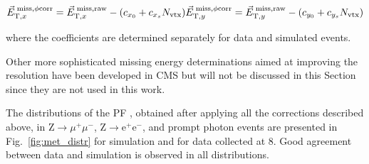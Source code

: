 \begin{equation}
{\vec E}_{\mathrm{T},x}^\mathrm{\; miss,\phi corr} = {\vec E}_{\mathrm{T},x}^\mathrm{\; miss,raw} - (c_{x_0} + c_{x_s}N_\mathrm{vtx})\\
{\vec E}_{\mathrm{T},y}^\mathrm{\; miss,\phi corr} = {\vec E}_{\mathrm{T},y}^\mathrm{\; miss,raw} - (c_{y_0} + c_{y_s}N_\mathrm{vtx})
\end{equation}

where the coefficients are determined separately for data and simulated events.

Other more sophisticated missing energy determinations aimed at improving the resolution have been developed in CMS\cite{Khachatryan:2014gga,CMS-PAS-JME-16-004} but will not be discussed in this Section since they are not used in this work.

The distributions of the PF \ETmiss, obtained after applying all the corrections described above, in Z$\rightarrow\mu^+\mu^-$, Z$\rightarrow$e$^+$e$^-$, and prompt photon events are presented in Fig.~\ref{fig:met_distr} for simulation and for data collected at 8\TeV. Good agreement between data and simulation is observed in all distributions.


